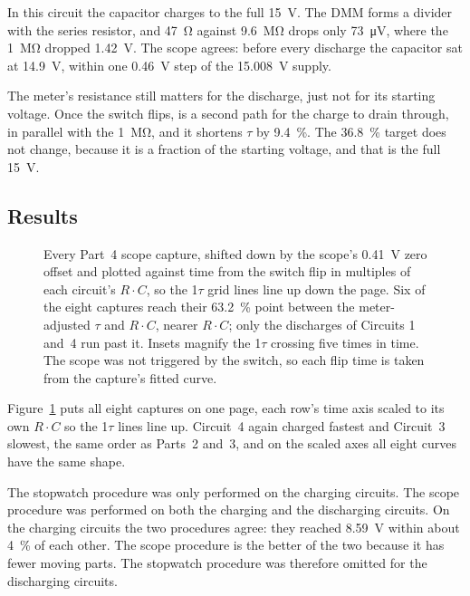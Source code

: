 \documentclass[offwhitecover]{lennylab}
\newcommand{\ntau}[1]{#1\(\tau\)}   %
\newcommand{\RC}{\mbox{\(R \cdot C\)}}
\begin{document}
In this circuit the capacitor charges to the full \qty{15}{\volt}. The DMM forms a divider with the series resistor, and \qty{47}{\ohm} against \qty{9.6}{\mega\ohm} drops only \qty{73}{\micro\volt}, where the \qty{1}{\mega\ohm} dropped \qty{1.42}{\volt}. The scope agrees: before every discharge the capacitor sat at \qty{14.9}{\volt}, within one \qty{0.46}{\volt} step of the \qty{15.008}{\volt} supply.

The meter's resistance still matters for the discharge, just not for its starting voltage. Once the switch flips, \Rvm{} is a second path for the charge to drain through, in parallel with the \qty{1}{\mega\ohm}, and it shortens $\tau$ by \qty{9.4}{\percent}. The \qty{36.8}{\percent} target does not change, because it is a fraction of the starting voltage, and that is the full \qty{15}{\volt}.

\subsection{Results}

\begin{figure}[p]
  
  \caption{Every Part~4 scope capture, shifted down by the scope's \qty{0.41}{\volt} zero offset and plotted against time from the switch flip in multiples of each circuit's \RC, so the \ntau{1} grid lines line up down the page. Six of the eight captures reach their \qty{63.2}{\percent} point between the meter-adjusted $\tau$ and \RC, nearer \RC; only the discharges of Circuits 1 and~4 run past it. Insets magnify the \ntau{1} crossing five times in time. The scope was not triggered by the switch, so each flip time is taken from the capture's fitted curve.}
  \label{fig:scope}
\end{figure}

Figure~\ref{fig:scope} puts all eight captures on one page, each row's time axis scaled to its own \RC{} so the \ntau{1} lines line up. Circuit~4 again charged fastest and Circuit~3 slowest, the same order as Parts~2 and~3, and on the scaled axes all eight curves have the same shape.

The stopwatch procedure was only performed on the charging circuits. The scope procedure was performed on both the charging and the discharging circuits. On the charging circuits the two procedures agree: they reached \qty{8.59}{\volt} within about \qty{4}{\percent} of each other. The scope procedure is the better of the two because it has fewer moving parts. The stopwatch procedure was therefore omitted for the discharging circuits.
\end{document}
